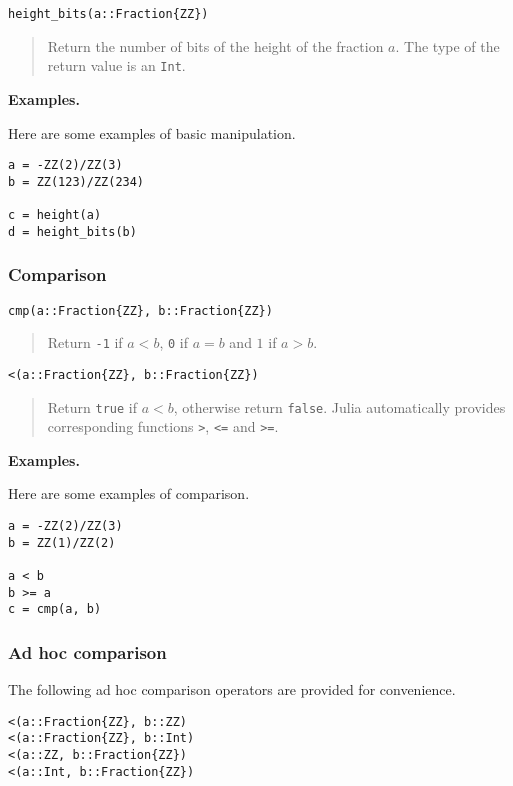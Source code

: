 \documentclass[a4paper,10pt]{article}
\newcommand{\code}{\lstinline}
\newcommand{\desc}[1]{\vspace{-3mm}\begin{quote}#1\end{quote}}
\begin{document}
{{\begin{lstlisting}
height_bits(a::Fraction{ZZ})
\end{lstlisting}

\desc{Return the number of bits of the height of the fraction $a$. The type of
the return value is an \code{Int}.}

\textbf{Examples.}

Here are some examples of basic manipulation.

\begin{lstlisting}
a = -ZZ(2)/ZZ(3)
b = ZZ(123)/ZZ(234)

c = height(a)
d = height_bits(b)
\end{lstlisting}

\subsubsection{Comparison}

\begin{lstlisting}
cmp(a::Fraction{ZZ}, b::Fraction{ZZ}) 
\end{lstlisting}

\desc{Return \code{-1} if $a < b$, \code{0} if $a = b$ and $1$ if $a > b$.}

\begin{lstlisting}
<(a::Fraction{ZZ}, b::Fraction{ZZ}) 
\end{lstlisting}

\desc{Return \code{true} if $a < b$, otherwise return \code{false}. Julia
automatically provides corresponding functions \code{>}, \code{<=} and
\code{>=}.}

\textbf{Examples.}

Here are some examples of comparison.

\begin{lstlisting}
a = -ZZ(2)/ZZ(3)
b = ZZ(1)/ZZ(2)

a < b
b >= a
c = cmp(a, b)
\end{lstlisting}

\subsubsection{Ad hoc comparison}

The following ad hoc comparison operators are provided for convenience.

\begin{lstlisting}
<(a::Fraction{ZZ}, b::ZZ)
<(a::Fraction{ZZ}, b::Int)
<(a::ZZ, b::Fraction{ZZ})
<(a::Int, b::Fraction{ZZ})
\end{lstlisting}

}}
\end{document}
